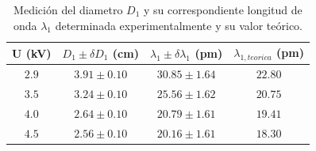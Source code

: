 \documentclass[10pt]{article}
\begin{document}
    \begin{table}[H]
        \centering
        \resizebox{3.3in}{!} {
            \begin{tabular}{cccc}
                \hline
                \multicolumn{1}{l|}{U (kV)} & \multicolumn{1}{l|}{$D_1 \pm \delta D_1$ (cm)}    & \multicolumn{1}{l|}{$\lambda_1 \pm \delta \lambda_1 $ (pm)}   & $\lambda_{1,teorica}$ (pm) \\ \hline
                $2.9$                       & $3.91 \pm 0.10$                                           & $30.85 \pm 1.64$                                                       & $ 22.80 $                      \\
                $3.5$                       & $3.24 \pm 0.10$                                           & $25.56 \pm 1.62$                                                       & $ 20.75 $                      \\
                $4.0$                       & $2.64 \pm 0.10$                                           & $20.79 \pm 1.61$                                                       & $ 19.41 $                      \\
                $4.5$                       & $2.56 \pm 0.10$                                           & $20.16 \pm 1.61$                                                       & $ 18.30 $                      \\ \hline
            \end{tabular}
        }
        \label{tab:datosD1}
        \caption{Medición del diametro $D_1$ y su correspondiente longitud de onda $\lambda_1$ determinada experimentalmente y su valor teórico.}
    \end{table}
\end{document}
